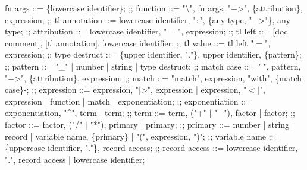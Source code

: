 \begin{bnfgrammar}
    fn args ::= \{lowercase identifier\};
    ;;
    function ::= "\textbackslash", fn args, "$-$>", \{attribution\}, expression;
    ;;
    tl annotation ::= lowercase identifier, "$\colon$", \{any type, "$-$>"\}, any type;
    ;;
    attribution ::= lowercase identifier, "$=$", expression;
    ;;
    tl left ::= [doc comment], [tl annotation], lowercase identifier;
    ;;
    tl value ::= tl left "$=$", expression;
    ;;
    type destruct ::= \{upper identifier, "."\}, upper identifier, \{pattern\};
    ;;
    pattern ::= "\_"
    | number
    | string
    | type destruct;
    ;;
    match case ::= "$\vert$", pattern, "$-$>", \{attribution\}, expression;
    ;;
    match ::= "match", expression, "with", \{match case\}-;
    ;;
    expression ::= expression, "$\vert$>", expression
    | expression, "$<$$\vert$", expression
        | function
        | match
        | exponentiation;
        ;;
        exponentiation ::= exponentiation, "\textasciicircum", term
        | term;
        ;;
        term ::= term, ("+" $\vert$ "$-$"), factor
        | factor;
        ;;
        factor ::= factor, ("\slash" $\vert$ "*"), primary
    | primary;
    ;;
    primary ::= number
    | string
    | record
    | variable name, \{primary\}
    | "(", expression, ")";
    ;;
    variable name ::= \{uppercase identifier, "."\}, record access;
    ;;
    record access ::= lowercase identifier, ".", record access
    | lowercase identifier;
\end{bnfgrammar}
